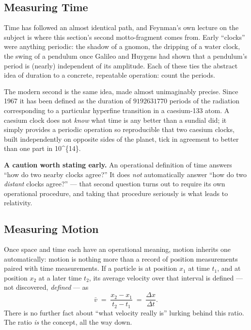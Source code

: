 \subsection{Measuring Time}

Time has followed an almost identical path, and Feynman's own lecture on the
subject is where this section's second motto-fragment comes from. Early
``clocks'' were anything periodic: the shadow of a gnomon, the dripping of a
water clock, the swing of a pendulum once Galileo and Huygens had shown that a
pendulum's period is (nearly) independent of its amplitude. Each of these ties
the abstract idea of duration to a concrete, repeatable operation: count the
periods.

The modern second is the same idea, made almost unimaginably precise. Since
1967 it has been defined as the duration of \(9192631770\) periods of
the radiation corresponding to a particular hyperfine transition in a
caesium-133 atom. A caesium clock does not \emph{know} what time is any better
than a sundial did; it simply provides a periodic operation so reproducible
that two caesium clocks, built independently on opposite sides of the planet,
tick in agreement to better than one part in \num{10^{14}}.

\begin{mdframed}[backgroundcolor=gray!8, linecolor=gray!40, linewidth=0.6pt, roundcorner=3pt]
\textbf{A caution worth stating early.} An operational definition of time
    answers ``how do two nearby clocks agree?'' It does \emph{not}
    automatically answer ``how do two \emph{distant} clocks agree?'' --- that
    second question turns out to require its own operational procedure, and
    taking that procedure seriously is what leads  to relativity.
\end{mdframed}

\subsection{Measuring Motion}

Once space and time each have an operational meaning, motion inherits one
automatically: motion is nothing more than a record of position measurements
paired with time measurements. If a particle is at position $x_1$ at time
$t_1$, and at position $x_2$ at a later time $t_2$, its average velocity over
that interval is defined --- not discovered, \emph{defined} --- as
\[
  \bar v \;=\; \frac{x_2 - x_1}{t_2 - t_1} \;=\; \frac{\Delta x}{\Delta t}.
\]
There is no further fact about ``what velocity really is'' lurking behind this
ratio. The ratio \emph{is} the concept, all the way down.

